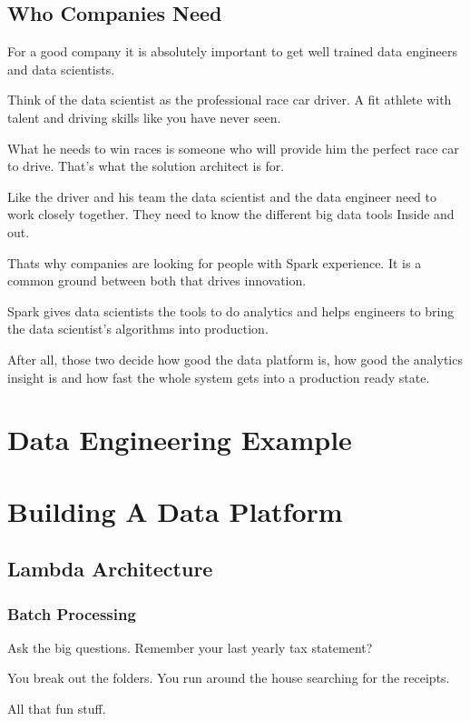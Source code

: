 \documentclass[12pt]{scrartcl} %
\begin{document}
\subsection{Who Companies Need}
For a good company it is absolutely important to get well trained data engineers and data scientists.

Think of the data scientist as the professional race car driver. A fit athlete with talent and driving skills like you have never seen.

What he needs to win races is someone who will provide him the perfect race car to drive. That’s what the solution architect is for.

Like the driver and his team the data scientist and the data engineer need to work closely together. They need to know the different big data tools Inside and out.

Thats why companies are looking for people with Spark experience. It is a common ground between both that drives innovation.

Spark gives data scientists the tools to do analytics and helps engineers to bring the data scientist’s algorithms into production.

After all, those two decide how good the data platform is, how good the analytics insight is and how fast the whole system gets into a production ready state.

\section{Data Engineering Example}

\section{Building A Data Platform}

\subsection{ Lambda Architecture}

\subsubsection{Batch Processing} Ask the big questions. Remember your last yearly tax statement?

You break out the folders. You run around the house searching for the receipts.

All that fun stuff.
\end{document}

